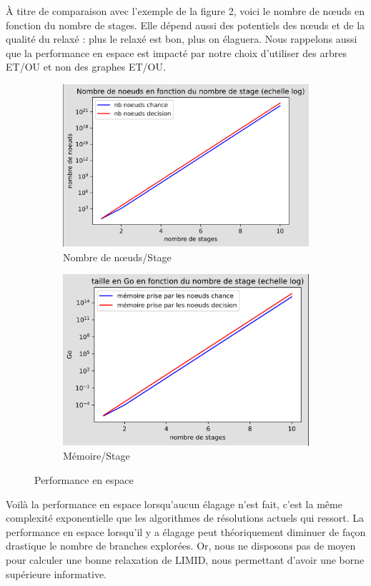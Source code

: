 \documentclass[12pt]{article}
\begin{document}
À titre de comparaison avec l'exemple de la figure 2, voici le nombre de nœuds en fonction du nombre de stages. 
Elle dépend aussi des potentiels des nœuds et de la qualité du relaxé : plus le relaxé est bon, plus on élaguera. 
\bigbreak
Nous rappelons aussi que la performance en espace est impacté par notre choix d'utiliser des arbres ET/OU et non des graphes ET/OU.

\begin{figure}[ht]
\centering
\begin{subfigure}{.5\textwidth}
  \centering
  \includegraphics[width=.65\linewidth]{docs/ressources_rapport/perf_espace.png}
  \caption{Nombre de nœuds/Stage}
  \label{fig:sub8}
\end{subfigure}%
\begin{subfigure}{.5\textwidth}
  \centering
  \includegraphics[width=.65\linewidth]{docs/ressources_rapport/perf_Go.png}
  \caption{Mémoire/Stage}
  \label{fig:sub9}
\end{subfigure}
\caption{Performance en espace}
\label{fig:test4}
\end{figure}

Voilà la performance en espace lorsqu'aucun élagage n'est fait, c'est la même complexité exponentielle que les algorithmes de résolutions actuels qui ressort.
\bigbreak
La performance en espace lorsqu'il y a élagage peut théoriquement diminuer de façon drastique le nombre de branches explorées. Or, nous ne disposons pas de moyen pour calculer une bonne relaxation de LIMID, nous permettant d'avoir une borne supérieure informative.
\pagebreak
\end{document}
